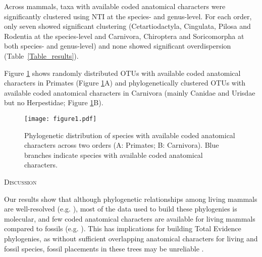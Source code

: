 \documentclass[12pt,letterpaper]{article}
\renewcommand{\section}[1]{%
\bigskip
\begin{center}
\begin{Large}
\normalfont\scshape #1
\medskip
\end{Large}
\end{center}}
\begin{document}



Across mammals, taxa with available coded anatomical characters were significantly clustered using NTI at the species- and genus-level.
For each order, only seven showed significant clustering (Cetartiodactyla, Cingulata, Pilosa and Rodentia at the species-level and Carnivora, Chiroptera and Soricomorpha at both species- and genus-level) and none showed significant overdispersion (Table~\ref{Table_results}).

Figure \ref{Figure_example_coverage} shows randomly distributed OTUs with available coded anatomical characters in Primates (Figure \ref{Figure_example_coverage}A) and phylogenetically clustered OTUs with available coded anatomical characters in Carnivora (mainly Canidae and Urisdae but no Herpestidae; Figure \ref{Figure_example_coverage}B).

\begin{figure}[!htbp]
\centering
    \texttt{[image: figure1.pdf]}
\caption{Phylogenetic distribution of species with available coded anatomical characters across two orders (A: Primates; B: Carnivora).
Blue branches indicate species with available coded anatomical characters.}
\label{Figure_example_coverage}
\end{figure}

%
%

\section{Discussion}
Our results show that although phylogenetic relationships among living mammals are well-resolved (e.g. \cite{BinindaEmonds,meredithimpacts2011}), most of the data used to build these phylogenies is molecular, and few coded anatomical characters are available for living mammals compared to fossils (e.g. \cite{O'Leary08022013,ni2013oldest}).
This has implications for building Total Evidence phylogenies, as without sufficient overlapping anatomical characters for living and fossil species, fossil placements in these trees may be unreliable \cite{GuillermeCooper}.
\end{document}
